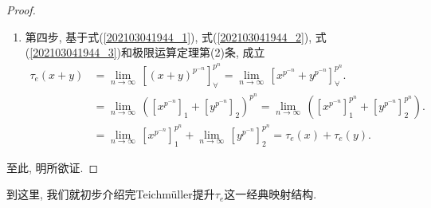 \documentclass[UTF8, twoside]{ctexart}
\theoremstyle{nonumberplain}
\newtheorem{proof}{\heiti 证明}  %
\theoremstyle{nonumberplain}
\theoremstyle{plain}
\begin{document}
\begin{proof}
\begin{enumerate}
\begin{enumerate}
				\item 第四步, 基于式(\ref{202103041944_1}), 式(\ref{202103041944_2}), 式(\ref{202103041944_3})和极限运算定理第(2)条, 成立
				\begin{align*}
					{{\tau }_{e}}\left( x+y \right)&=\underset{n\to \infty }{\mathop{\lim }}\,\left[ {{\left( x+y \right)}^{{{p}^{-n}}}} \right]_{\forall }^{{{p}^{n}}}=\underset{n\to \infty }{\mathop{\lim }}\,\left[ {{x}^{{{p}^{-n}}}}+{{y}^{{{p}^{-n}}}} \right]_{\forall }^{{{p}^{n}}}. \\ 
					& =\underset{n\to \infty }{\mathop{\lim }}\,{{\left( {{\left[ {{x}^{{{p}^{-n}}}} \right]}_{1}}+{{\left[ {{y}^{{{p}^{-n}}}} \right]}_{2}} \right)}^{{{p}^{n}}}}=\underset{n\to \infty }{\mathop{\lim }}\,\left( \left[ {{x}^{{{p}^{-n}}}} \right]_{1}^{{{p}^{n}}}+\left[ {{y}^{{{p}^{-n}}}} \right]_{2}^{{{p}^{n}}} \right). \\ 
					& =\underset{n\to \infty }{\mathop{\lim }}\,\left[ {{x}^{{{p}^{-n}}}} \right]_{1}^{{{p}^{n}}}+\underset{n\to \infty }{\mathop{\lim }}\,\left[ {{y}^{{{p}^{-n}}}} \right]_{2}^{{{p}^{n}}}={{\tau }_{e}}\left( x \right)+{{\tau }_{e}}\left( y \right).  
				\end{align*}
			\end{enumerate}
		\end{enumerate}
		\vskip 0.3cm
		至此, 明所欲证.
	\end{proof}
	\vskip 0.5cm
	
	到这里, 我们就初步介绍完Teichmüller提升$\tau_e$这一经典映射结构.
	
	\newpage
\end{document}
